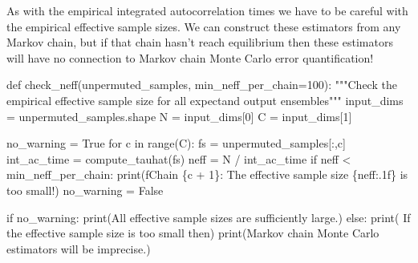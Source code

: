 \documentclass[
  letterpaper,
  DIV=11,
  numbers=noendperiod]{scrartcl}
\newenvironment{Shaded}{\begin{snugshade}}{\end{snugshade}}
\newcommand{\BuiltInTok}[1]{\textcolor[rgb]{0.00,0.23,0.31}{#1}}
\newcommand{\CommentTok}[1]{\textcolor[rgb]{0.37,0.37,0.37}{#1}}
\newcommand{\ControlFlowTok}[1]{\textcolor[rgb]{0.00,0.23,0.31}{#1}}
\newcommand{\DecValTok}[1]{\textcolor[rgb]{0.68,0.00,0.00}{#1}}
\newcommand{\KeywordTok}[1]{\textcolor[rgb]{0.00,0.23,0.31}{#1}}
\newcommand{\NormalTok}[1]{\textcolor[rgb]{0.00,0.23,0.31}{#1}}
\newcommand{\OperatorTok}[1]{\textcolor[rgb]{0.37,0.37,0.37}{#1}}
\newcommand{\SpecialCharTok}[1]{\textcolor[rgb]{0.37,0.37,0.37}{#1}}
\newcommand{\SpecialStringTok}[1]{\textcolor[rgb]{0.13,0.47,0.30}{#1}}
\newcommand{\StringTok}[1]{\textcolor[rgb]{0.13,0.47,0.30}{#1}}
\newcommand{\VariableTok}[1]{\textcolor[rgb]{0.07,0.07,0.07}{#1}}
\begin{document}
As with the empirical integrated autocorrelation times we have to be
careful with the empirical effective sample sizes. We can construct
these estimators from any Markov chain, but if that chain hasn't reach
equilibrium then these estimators will have no connection to Markov
chain Monte Carlo error quantification!

\begin{Shaded}
\begin{Highlighting}[]
\KeywordTok{def}\NormalTok{ check\_neff(unpermuted\_samples, min\_neff\_per\_chain}\OperatorTok{=}\DecValTok{100}\NormalTok{):}
  \CommentTok{"""Check the empirical effective sample size for all expectand output ensembles"""}
\NormalTok{  input\_dims }\OperatorTok{=}\NormalTok{ unpermuted\_samples.shape}
\NormalTok{  N }\OperatorTok{=}\NormalTok{ input\_dims[}\DecValTok{0}\NormalTok{]}
\NormalTok{  C }\OperatorTok{=}\NormalTok{ input\_dims[}\DecValTok{1}\NormalTok{]}
  
\NormalTok{  no\_warning }\OperatorTok{=} \VariableTok{True}
  \ControlFlowTok{for}\NormalTok{ c }\KeywordTok{in} \BuiltInTok{range}\NormalTok{(C):}
\NormalTok{    fs }\OperatorTok{=}\NormalTok{ unpermuted\_samples[:,c]}
\NormalTok{    int\_ac\_time }\OperatorTok{=}\NormalTok{ compute\_tauhat(fs)}
\NormalTok{    neff }\OperatorTok{=}\NormalTok{ N }\OperatorTok{/}\NormalTok{ int\_ac\_time}
    \ControlFlowTok{if}\NormalTok{ neff }\OperatorTok{\textless{}}\NormalTok{ min\_neff\_per\_chain:}
      \BuiltInTok{print}\NormalTok{(}\SpecialStringTok{f\textquotesingle{}Chain }\SpecialCharTok{\{}\NormalTok{c }\OperatorTok{+} \DecValTok{1}\SpecialCharTok{\}}\SpecialStringTok{: The effective sample size }\SpecialCharTok{\{}\NormalTok{neff}\SpecialCharTok{:.1f\}}\SpecialStringTok{ is too small!\textquotesingle{}}\NormalTok{)}
\NormalTok{      no\_warning }\OperatorTok{=} \VariableTok{False}
  
  \ControlFlowTok{if}\NormalTok{ no\_warning:}
    \BuiltInTok{print}\NormalTok{(}\StringTok{\textquotesingle{}All effective sample sizes are sufficiently large.\textquotesingle{}}\NormalTok{)}
  \ControlFlowTok{else}\NormalTok{:}
    \BuiltInTok{print}\NormalTok{(}\StringTok{\textquotesingle{}  If the effective sample size is too small then\textquotesingle{}}\NormalTok{)}
    \BuiltInTok{print}\NormalTok{(}\StringTok{\textquotesingle{}Markov chain Monte Carlo estimators will be imprecise.\textquotesingle{}}\NormalTok{)}
\end{Highlighting}
\end{Shaded}
\end{document}
